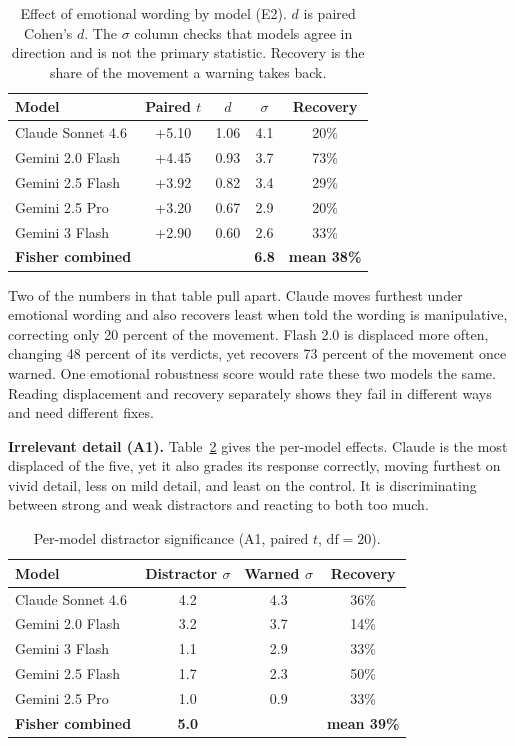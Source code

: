 \documentclass[conference]{IEEEtran}
\begin{document}
\begin{table}[htbp]
\caption{Effect of emotional wording by model (E2). $d$ is paired Cohen's $d$. The $\sigma$ column checks that models agree in direction and is not the primary statistic. Recovery is the share of the movement a warning takes back.}
\label{tab:e2sigma}
\centering
\begin{tabular}{@{}lcccc@{}}
\toprule
\textbf{Model} & \textbf{Paired $t$} & \textbf{$d$} & \textbf{$\sigma$} & \textbf{Recovery} \\
\midrule
Claude Sonnet 4.6 & +5.10 & 1.06 & 4.1 & 20\% \\
Gemini 2.0 Flash & +4.45 & 0.93 & 3.7 & 73\% \\
Gemini 2.5 Flash & +3.92 & 0.82 & 3.4 & 29\% \\
Gemini 2.5 Pro & +3.20 & 0.67 & 2.9 & 20\% \\
Gemini 3 Flash & +2.90 & 0.60 & 2.6 & 33\% \\
\midrule
\textbf{Fisher combined} & & & \textbf{6.8} & \textbf{mean 38\%} \\
\bottomrule
\end{tabular}
\end{table}

Two of the numbers in that table pull apart. Claude moves furthest under emotional wording and also recovers least when told the wording is manipulative, correcting only 20 percent of the movement. Flash 2.0 is displaced more often, changing 48 percent of its verdicts, yet recovers 73 percent of the movement once warned. One emotional robustness score would rate these two models the same. Reading displacement and recovery separately shows they fail in different ways and need different fixes.

\textbf{Irrelevant detail (A1).} Table~\ref{tab:a1sigma} gives the per-model effects. Claude is the most displaced of the five, yet it also grades its response correctly, moving furthest on vivid detail, less on mild detail, and least on the control. It is discriminating between strong and weak distractors and reacting to both too much.

\begin{table}[htbp]
\caption{Per-model distractor significance (A1, paired $t$, $\text{df}=20$).}
\label{tab:a1sigma}
\centering
\begin{tabular}{@{}lccc@{}}
\toprule
\textbf{Model} & \textbf{Distractor $\sigma$} & \textbf{Warned $\sigma$} & \textbf{Recovery} \\
\midrule
Claude Sonnet 4.6 & 4.2 & 4.3 & 36\% \\
Gemini 2.0 Flash & 3.2 & 3.7 & 14\% \\
Gemini 3 Flash & 1.1 & 2.9 & 33\% \\
Gemini 2.5 Flash & 1.7 & 2.3 & 50\% \\
Gemini 2.5 Pro & 1.0 & 0.9 & 33\% \\
\midrule
\textbf{Fisher combined} & \textbf{5.0} & & \textbf{mean 39\%} \\
\bottomrule
\end{tabular}
\end{table}
\end{document}
